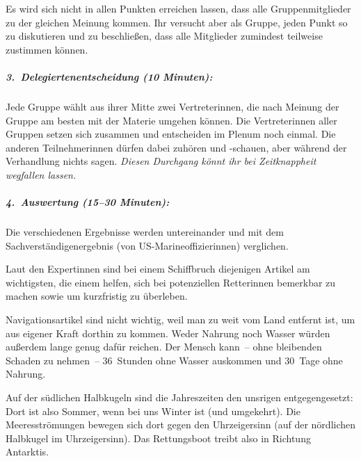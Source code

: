 Es wird sich nicht in allen Punkten erreichen lassen, dass alle Gruppenmitglieder zu der gleichen Meinung kommen. Ihr versucht aber als Gruppe, jeden Punkt so zu diskutieren und zu beschließen, dass alle Mitglieder zumindest teilweise zustimmen können.
\subparagraph{3.~Delegiertenentscheidung (10 Minuten):} Jede Gruppe wählt aus ihrer Mitte zwei Vertreterinnen, die nach Meinung der Gruppe am besten mit der Materie umgehen können. Die Vertreterinnen aller Gruppen setzen sich zusammen und entscheiden im Plenum noch einmal. Die anderen Teilnehmerinnen dürfen dabei zuhören und -schauen, aber während der Verhandlung nichts sagen. \emph{Diesen Durchgang könnt ihr bei Zeitknappheit wegfallen lassen.}
\subparagraph{4.~Auswertung (15--30 Minuten):} Die verschiedenen Ergebnisse werden untereinander und mit dem Sachverständigenergebnis (von US-Marineoffizierinnen) verglichen.

Laut den Expertinnen sind bei einem Schiffbruch diejenigen Artikel am wichtigsten, die einem helfen, sich bei potenziellen Retterinnen bemerkbar zu machen sowie um kurzfristig zu überleben.

Navigationsartikel sind nicht wichtig, weil man zu weit vom Land entfernt ist, um aus eigener Kraft dorthin zu kommen. Weder Nahrung noch Wasser würden außerdem lange genug dafür reichen. Der Mensch kann~-- ohne bleibenden Schaden zu nehmen~-- 36~Stunden ohne Wasser auskommen und 30~Tage ohne Nahrung.

Auf der südlichen Halbkugeln sind die Jahreszeiten den unsrigen entgegengesetzt: Dort ist also Sommer, wenn bei uns Winter ist (und umgekehrt). Die Meeresströmungen bewegen sich dort gegen den Uhrzeigersinn (auf der nördlichen Halbkugel im Uhrzeigersinn). Das Rettungsboot treibt also in Richtung Antarktis.

